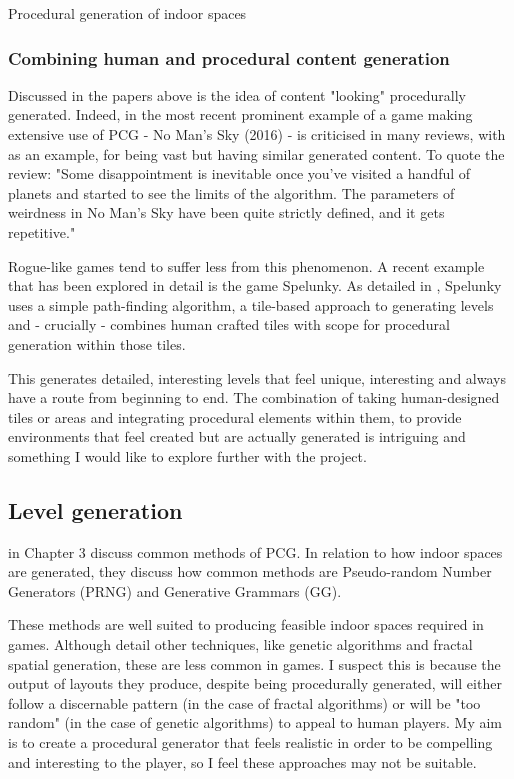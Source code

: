 \documentclass[review]{cmpreport}
\begin{document}
\begin{section}{Procedural generation of indoor spaces}
\subsubsection{Combining human and procedural content generation}
Discussed in the papers above is the idea of content "looking" procedurally generated. Indeed, in the most recent prominent example of a game making extensive use of PCG - No Man's Sky (2016) - is criticised in many reviews, with \cite{welsh_2016} as an example, for being vast but having similar generated content. To quote the review: "Some disappointment is inevitable once you've visited a handful of planets and started to see the limits of the algorithm. The parameters of weirdness in No Man's Sky have been quite strictly defined, and it gets repetitive." \par
Rogue-like games tend to suffer less from this phenomenon. A recent example that has been explored in detail is the game Spelunky. As detailed in \cite{gct-spelunky}, Spelunky uses a simple path-finding algorithm, a tile-based approach to generating levels and - crucially - combines human crafted tiles with scope for procedural generation within those tiles. \par
This generates detailed, interesting levels that feel unique, interesting and always have a route from beginning to end. The combination of taking human-designed tiles or areas and integrating procedural elements within them, to provide environments that feel created but are actually generated is intriguing and something I would like to explore further with the project.

\section{Level generation}
\cite{Hendrikx:2013:PCG:2422956.2422957} in Chapter 3 discuss common methods of PCG. In relation to how indoor spaces are generated, they discuss how common methods are Pseudo-random Number Generators (PRNG) and Generative Grammars (GG). \par
These methods are well suited to producing feasible indoor spaces required in games. Although \cite{Hendrikx:2013:PCG:2422956.2422957} detail other techniques, like genetic algorithms and fractal spatial generation, these are less common in games. I suspect this is because the output of layouts they produce, despite being procedurally generated, will either follow a discernable pattern (in the case of fractal algorithms) or will be "too random" (in the case of genetic algorithms) to appeal to human players. My aim is to create a procedural generator that feels realistic in order to be compelling and interesting to the player, so I feel these approaches may not be suitable.


\end{section}
\end{document}
